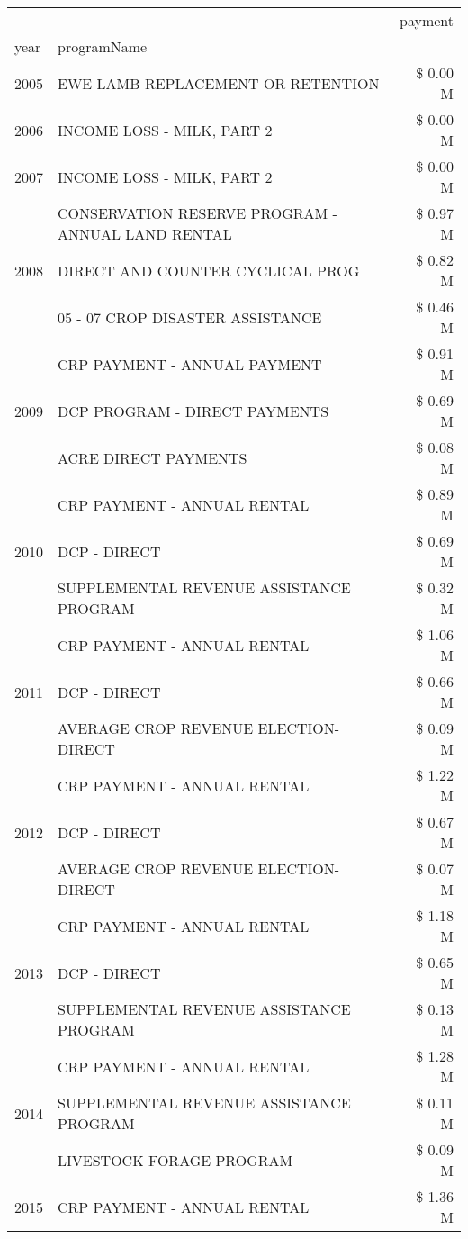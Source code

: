 \begin{tabular}{llr}
\toprule
 &  & payment \\
year & programName &  \\
\midrule
2005 & EWE LAMB REPLACEMENT OR RETENTION & \$ 0.00 M \\
\cline{1-3}
2006 & INCOME LOSS - MILK, PART 2 & \$ 0.00 M \\
\cline{1-3}
2007 & INCOME LOSS - MILK, PART 2 & \$ 0.00 M \\
\cline{1-3}
\multirow[t]{3}{*}{2008} & CONSERVATION RESERVE PROGRAM - ANNUAL LAND RENTAL & \$ 0.97 M \\
 & DIRECT AND COUNTER CYCLICAL PROG & \$ 0.82 M \\
 & 05 - 07 CROP DISASTER ASSISTANCE & \$ 0.46 M \\
\cline{1-3}
\multirow[t]{3}{*}{2009} & CRP PAYMENT - ANNUAL PAYMENT & \$ 0.91 M \\
 & DCP PROGRAM - DIRECT PAYMENTS & \$ 0.69 M \\
 & ACRE DIRECT PAYMENTS & \$ 0.08 M \\
\cline{1-3}
\multirow[t]{3}{*}{2010} & CRP PAYMENT - ANNUAL RENTAL & \$ 0.89 M \\
 & DCP - DIRECT & \$ 0.69 M \\
 & SUPPLEMENTAL REVENUE ASSISTANCE PROGRAM & \$ 0.32 M \\
\cline{1-3}
\multirow[t]{3}{*}{2011} & CRP PAYMENT - ANNUAL RENTAL & \$ 1.06 M \\
 & DCP - DIRECT & \$ 0.66 M \\
 & AVERAGE CROP REVENUE ELECTION-DIRECT & \$ 0.09 M \\
\cline{1-3}
\multirow[t]{3}{*}{2012} & CRP PAYMENT - ANNUAL RENTAL & \$ 1.22 M \\
 & DCP - DIRECT & \$ 0.67 M \\
 & AVERAGE CROP REVENUE ELECTION-DIRECT & \$ 0.07 M \\
\cline{1-3}
\multirow[t]{3}{*}{2013} & CRP PAYMENT - ANNUAL RENTAL & \$ 1.18 M \\
 & DCP - DIRECT & \$ 0.65 M \\
 & SUPPLEMENTAL REVENUE ASSISTANCE PROGRAM & \$ 0.13 M \\
\cline{1-3}
\multirow[t]{3}{*}{2014} & CRP PAYMENT - ANNUAL RENTAL & \$ 1.28 M \\
 & SUPPLEMENTAL REVENUE ASSISTANCE PROGRAM & \$ 0.11 M \\
 & LIVESTOCK FORAGE PROGRAM & \$ 0.09 M \\
\cline{1-3}
\multirow[t]{3}{*}{2015} & CRP PAYMENT - ANNUAL RENTAL & \$ 1.36 M \\

\end{tabular}
